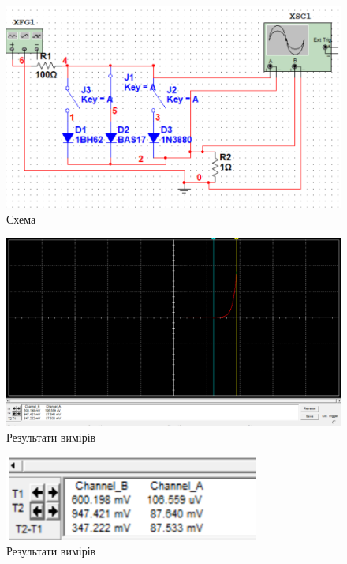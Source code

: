 \begin{figure}[ht]

\centering

\includegraphics[width=0.6\linewidth]{Діод2Схема.png}

\caption{Схема}

\label{Diod2Shema}

\end{figure}

\begin{figure}[ht]

\centering

\includegraphics[width=0.75\linewidth]{Діод2Осцилограф.png}

\caption{Результати вимірів}

\label{Diod2Osc}

\end{figure}

\begin{figure}[ht]

\centering

\includegraphics[width=0.3\linewidth]{Діод2Рез.png}

\caption{Результати вимірів}

\label{Diod2Rez}

\end{figure}
